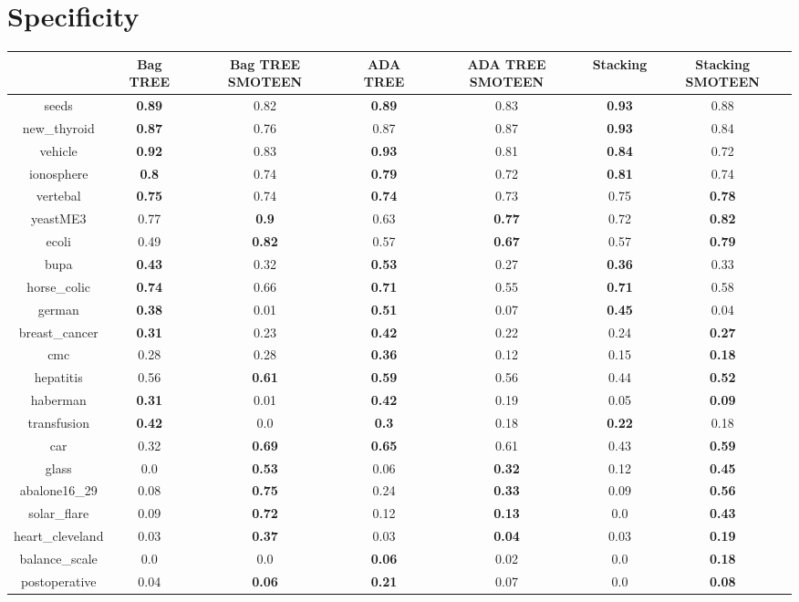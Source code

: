 \documentclass{article}%
\begin{document}
%
\section*{Specificity}%
\begin{tabular}{c|cccccc}%
&Bag TREE&Bag TREE SMOTEEN&ADA TREE&ADA TREE SMOTEEN&Stacking&Stacking SMOTEEN\\%
\hline%
seeds&\textbf{0.89}&0.82&\textbf{0.89}&0.83&\textbf{0.93}&0.88\\%
new\_thyroid&\textbf{0.87}&0.76&0.87&0.87&\textbf{0.93}&0.84\\%
vehicle&\textbf{0.92}&0.83&\textbf{0.93}&0.81&\textbf{0.84}&0.72\\%
ionosphere&\textbf{0.8}&0.74&\textbf{0.79}&0.72&\textbf{0.81}&0.74\\%
vertebal&\textbf{0.75}&0.74&\textbf{0.74}&0.73&0.75&\textbf{0.78}\\%
yeastME3&0.77&\textbf{0.9}&0.63&\textbf{0.77}&0.72&\textbf{0.82}\\%
ecoli&0.49&\textbf{0.82}&0.57&\textbf{0.67}&0.57&\textbf{0.79}\\%
bupa&\textbf{0.43}&0.32&\textbf{0.53}&0.27&\textbf{0.36}&0.33\\%
horse\_colic&\textbf{0.74}&0.66&\textbf{0.71}&0.55&\textbf{0.71}&0.58\\%
german&\textbf{0.38}&0.01&\textbf{0.51}&0.07&\textbf{0.45}&0.04\\%
breast\_cancer&\textbf{0.31}&0.23&\textbf{0.42}&0.22&0.24&\textbf{0.27}\\%
cmc&0.28&0.28&\textbf{0.36}&0.12&0.15&\textbf{0.18}\\%
hepatitis&0.56&\textbf{0.61}&\textbf{0.59}&0.56&0.44&\textbf{0.52}\\%
haberman&\textbf{0.31}&0.01&\textbf{0.42}&0.19&0.05&\textbf{0.09}\\%
transfusion&\textbf{0.42}&0.0&\textbf{0.3}&0.18&\textbf{0.22}&0.18\\%
car&0.32&\textbf{0.69}&\textbf{0.65}&0.61&0.43&\textbf{0.59}\\%
glass&0.0&\textbf{0.53}&0.06&\textbf{0.32}&0.12&\textbf{0.45}\\%
abalone16\_29&0.08&\textbf{0.75}&0.24&\textbf{0.33}&0.09&\textbf{0.56}\\%
solar\_flare&0.09&\textbf{0.72}&0.12&\textbf{0.13}&0.0&\textbf{0.43}\\%
heart\_cleveland&0.03&\textbf{0.37}&0.03&\textbf{0.04}&0.03&\textbf{0.19}\\%
balance\_scale&0.0&0.0&\textbf{0.06}&0.02&0.0&\textbf{0.18}\\%
postoperative&0.04&\textbf{0.06}&\textbf{0.21}&0.07&0.0&\textbf{0.08}\\%
\end{tabular}
\end{document}
